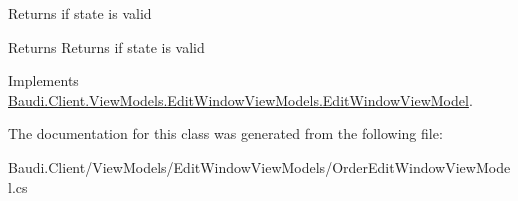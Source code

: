 Returns if state is valid 

\begin{DoxyReturn}{Returns}
Returns if state is valid
\end{DoxyReturn}


Implements \hyperlink{class_baudi_1_1_client_1_1_view_models_1_1_edit_window_view_models_1_1_edit_window_view_model_aeae328bfe7608e01ce3c54da0c13f781}{Baudi.\+Client.\+View\+Models.\+Edit\+Window\+View\+Models.\+Edit\+Window\+View\+Model}.



The documentation for this class was generated from the following file\+:\begin{DoxyCompactItemize}
\item 
Baudi.\+Client/\+View\+Models/\+Edit\+Window\+View\+Models/Order\+Edit\+Window\+View\+Model.\+cs\end{DoxyCompactItemize}
